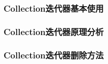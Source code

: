 \subsubsection*{Collection迭代器基本使用}

\subsubsection*{Collection迭代器原理分析}

\subsubsection*{Collection迭代器删除方法}


